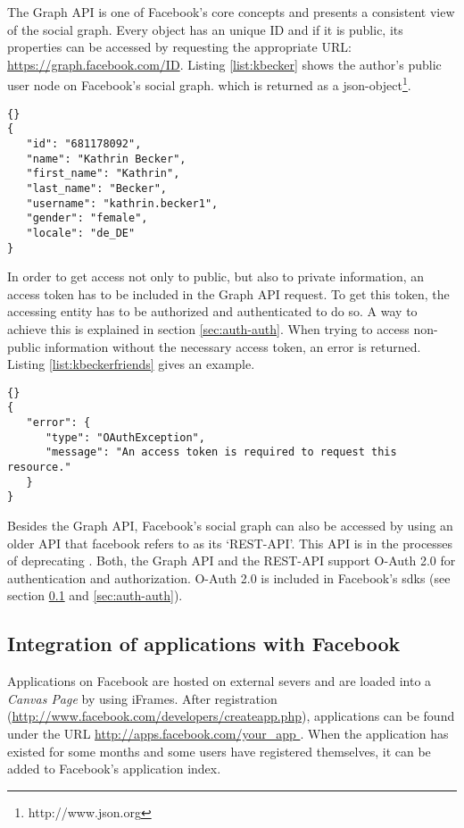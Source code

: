 \documentclass[preprint,12pt]{elsarticle}
\begin{document}
The Graph API is one of Facebook's core concepts and presents a consistent
view of the social graph. Every object has an unique ID and if it is
public, its properties can be accessed by requesting the appropriate URL:
\url{https://graph.facebook.com/ID}. Listing \ref{list:kbecker} shows
the author's public user node on Facebook's social graph. which is
returned as a \ac{json}-object\footnote{http://www.json.org}.

\begin{lstlisting}[caption=JSON object from
  \url{https://graph.facebook.com/681178092},
  label=list:kbecker]{}
{
   "id": "681178092",
   "name": "Kathrin Becker",
   "first_name": "Kathrin",
   "last_name": "Becker",
   "username": "kathrin.becker1",
   "gender": "female",
   "locale": "de_DE"
}
\end{lstlisting}

In order to get access not only to public, but also to private
information, an access token has to be included in the Graph API
request. To get this token, the accessing entity has to be
authorized and authenticated to do so. A way to achieve this is
explained in section \ref{sec:auth-auth}. When trying to access
non-public information without the necessary access token, an error
is returned. Listing \ref{list:kbeckerfriends} gives an example.


\begin{lstlisting}[caption=JSON object from
  \url{https://graph.facebook.com/681178092/friends},
  label=list:kbeckerfriends]{}
{
   "error": {
      "type": "OAuthException",
      "message": "An access token is required to request this resource."
   }
}
\end{lstlisting}


Besides the Graph API, Facebook's social graph can also be accessed
by using an older API that facebook refers to as its `REST-API'. This API is in the processes of deprecating
\cite{facebookDev3}. Both, the Graph API and the REST-API support
O-Auth 2.0 for authentication and authorization. O-Auth 2.0 is
included in Facebook's \ac{sdks} (see section
\ref{sec:integr-appl-with} and \ref{sec:auth-auth}).




\subsection{Integration of applications with Facebook}
\label{sec:integr-appl-with}
Applications on Facebook are hosted on external severs and are loaded
into a \textit{Canvas Page} by using iFrames. After registration
(\url{http://www.facebook.com/developers/createapp.php}), applications
can be found under the URL \url{http://apps.facebook.com/your_app }.
When the application has existed for some months and 
some users have registered themselves, it can be added to Facebook's application
index. 
\end{document}
